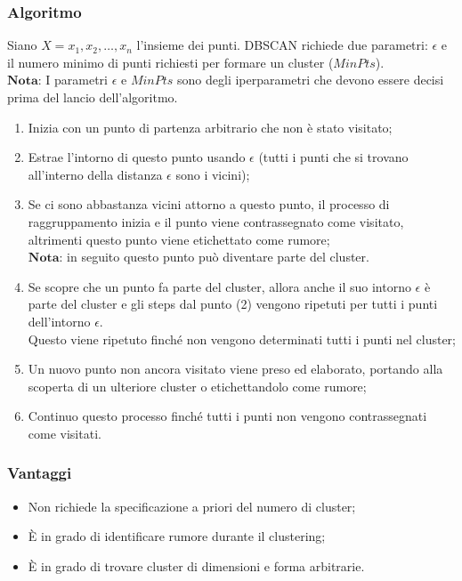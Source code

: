         \subsubsection{Algoritmo}
            Siano $X = {x_{1}, x_{2}, \ldots, x_{n}}$ l'insieme dei punti.
            DBSCAN richiede due parametri: $\epsilon$ e il numero minimo di punti richiesti per formare un cluster ($MinPts$).
            \\[1\baselineskip]
            $\textbf{Nota:}$ I parametri $\epsilon$ e $MinPts$ sono degli iperparametri che devono essere decisi prima del lancio dell'algoritmo.

            \begin{enumerate}
                \item Inizia con un punto di partenza arbitrario che non è stato visitato;
                \item Estrae l'intorno di questo punto usando $\epsilon$ (tutti i punti che si trovano all'interno della distanza $\epsilon$ sono i vicini);
                \item Se ci sono abbastanza vicini attorno a questo punto, il processo di raggruppamento inizia e il punto viene contrassegnato come visitato, altrimenti questo punto viene etichettato come rumore;
                    \\[0.5\baselineskip]
                    $\textbf{Nota:}$ in seguito questo punto può diventare parte del cluster.
                \item Se scopre che un punto fa parte del cluster, allora anche il suo intorno $\epsilon$ è parte del cluster e gli steps dal punto (2) vengono ripetuti per tutti i punti dell'intorno $\epsilon$.
                    \\
                    Questo viene ripetuto finché non vengono determinati tutti i punti nel cluster;
                \item Un nuovo punto non ancora visitato viene preso ed elaborato, portando alla scoperta di un ulteriore cluster o etichettandolo come rumore;
                \item Continuo questo processo finché tutti i punti non vengono contrassegnati come visitati.
            \end{enumerate}

        \subsubsection{Vantaggi}
            \begin{itemize}
                \item Non richiede la specificazione a priori del numero di cluster;
                \item È in grado di identificare rumore durante il clustering;
                \item È in grado di trovare cluster di dimensioni e forma arbitrarie.
            \end{itemize}

